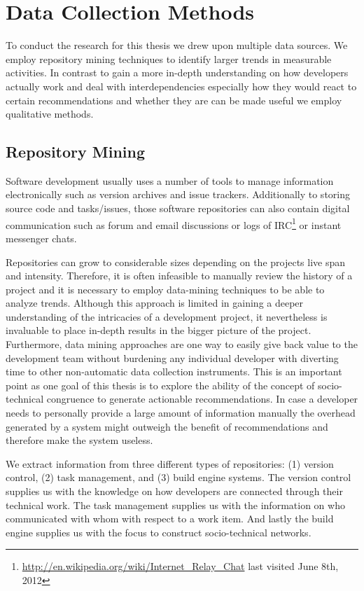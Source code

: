 \section{Data Collection Methods}
\label{c5:sec:datacollection}
To conduct the research for this thesis we drew upon multiple data sources.
We employ repository mining techniques to identify larger trends in measurable activities.
In contrast to gain a more in-depth understanding on how developers actually work and deal with interdependencies especially how they would react to certain recommendations and whether they are can be made useful we employ qualitative methods.

\subsection{Repository Mining}
Software development usually uses a number of tools to manage information electronically such as version archives and issue trackers.
Additionally to storing source code and tasks/issues, those software repositories can also contain digital communication such as forum and email discussions or logs of IRC\footnote{\url{http://en.wikipedia.org/wiki/Internet_Relay_Chat} last visited June 8th, 2012} or instant messenger chats.

Repositories can grow to considerable sizes depending on the projects live span and intensity. 
Therefore, it is often infeasible to manually review the history of a project and it is necessary to employ data-mining techniques to be able to analyze trends.
Although this approach is limited in gaining a deeper understanding of the intricacies of a development project, it nevertheless is invaluable to place in-depth results in the bigger picture of the project.
Furthermore, data mining approaches are one way to easily give back value to the development team without burdening any individual developer with diverting time to other non-automatic data collection instruments.
This is an important point as one goal of this thesis is to explore the ability of the concept of socio-technical congruence to generate actionable recommendations.
In case a developer needs to personally provide a large amount of information manually the overhead generated by a system might outweigh the benefit of recommendations and therefore make the system useless.

We extract information from three different types of repositories: (1) version control, (2) task management, and (3) build engine systems.
The version control supplies us with the knowledge on how developers are connected through their technical work.
The task management supplies us with the information on who communicated with whom with respect to a work item.
And lastly the build engine supplies us with the focus to construct socio-technical networks.

